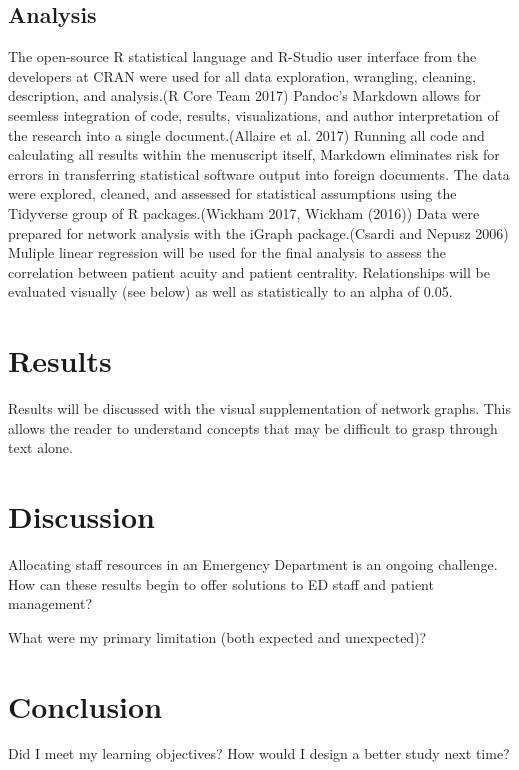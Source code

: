\documentclass[]{elsarticle} %
\begin{document}
\subsection{Analysis}\label{analysis}

The open-source R statistical language and R-Studio user interface from
the developers at CRAN were used for all data exploration, wrangling,
cleaning, description, and analysis.(R Core Team 2017) Pandoc's Markdown
allows for seemless integration of code, results, visualizations, and
author interpretation of the research into a single document.(Allaire et
al. 2017) Running all code and calculating all results within the
menuscript itself, Markdown eliminates risk for errors in transferring
statistical software output into foreign documents. The data were
explored, cleaned, and assessed for statistical assumptions using the
Tidyverse group of R packages.(Wickham 2017, Wickham (2016)) Data were
prepared for network analysis with the iGraph package.(Csardi and Nepusz
2006) Muliple linear regression will be used for the final analysis to
assess the correlation between patient acuity and patient centrality.
Relationships will be evaluated visually (see below) as well as
statistically to an alpha of 0.05.

\section{Results}\label{results-1}

Results will be discussed with the visual supplementation of network
graphs. This allows the reader to understand concepts that may be
difficult to grasp through text alone.

\section{Discussion}\label{discussion}

Allocating staff resources in an Emergency Department is an ongoing
challenge. How can these results begin to offer solutions to ED staff
and patient management?

What were my primary limitation (both expected and unexpected)?

\section{Conclusion}\label{conclusion}

Did I meet my learning objectives? How would I design a better study
next time?
\end{document}
